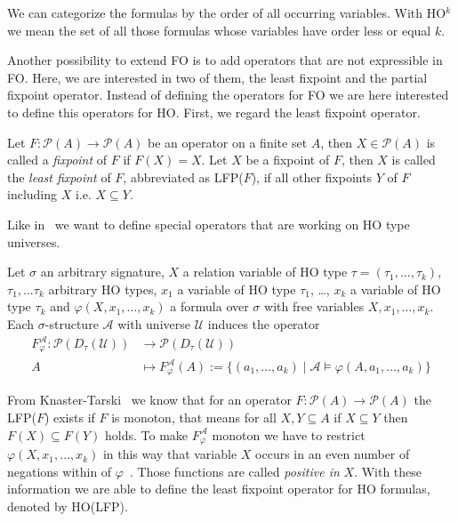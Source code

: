 We can categorize the formulas by the order of all occurring variables. With HO$^k$ we mean the set of all those
formulas whose variables have order less or equal $k$.

Another possibility to extend FO is to add operators that are not expressible in FO. Here, we are interested in two
of them, the least fixpoint and the partial fixpoint operator. Instead of defining the operators for FO we are
here interested to define this operators for HO. First, we regard the least fixpoint operator.

\begin{definition}
   Let $F: \mathscr{P}(A) \rightarrow \mathscr{P}(A)$ be an operator on a finite set $A$, then $X \in \mathscr{P}(A)$
   is called a \emph{fixpoint} of $F$ if $F(X) = X$. Let $X$ be a fixpoint of $F$, then $X$ is called the \emph{least
   fixpoint} of $F$, abbreviated as LFP($F$), if all other fixpoints $Y$ of $F$ including $X$ i.e. $X \subseteq Y$.
\end{definition}

Like in~\cite{freireMartins2011descriptive} we want to define special operators that are working on HO type
universes.

\begin{definition}
    Let $\sigma$ an arbitrary signature, $X$ a relation variable of HO type $\tau = (\tau_1, \dots, \tau_k)$,
    $\tau_1, \dots \tau_k$ arbitrary HO types, $x_1$ a variable of HO type $\tau_1$, \dots, $x_k$ a
    variable of HO type $\tau_k$ and $\varphi(X, x_1, \dots, x_k)$ a formula over $\sigma$ with free variables $X, x_1,
    \dots, x_k$. Each $\sigma$-structure $\mathcal{A}$ with universe $\mathcal{U}$ induces the operator
    \begin{align*}
        F_\varphi^\mathcal{A} : \mathscr{P}(D_\tau(\mathcal{U})) &\longrightarrow \mathscr{P}(D_\tau(\mathcal{U}))\\
        A &\longmapsto F_\varphi^\mathcal{A}(A) := \{(a_1, \dots, a_k) \mid \mathcal{A} \models \varphi(A, a_1, \dots, a_k)\}
    \end{align*}
\end{definition}

From Knaster-Tarski~\cite{tarski1955lattice} we know that for an operator $F: \mathscr{P}(A) \rightarrow \mathscr{P}
(A)$ the LFP($F$) exists if $F$ is monoton, that means for all $X, Y \subseteq A$ if $X \subseteq Y$ then $F(X)
\subseteq F(Y)$ holds. To make $F_\varphi^\mathcal{A}$ monoton we have to restrict $\varphi(X, x_1, \dots, x_k)$ in this way
that variable $X$ occurs in an even number of negations within of $\varphi$~\cite{freireMartins2011descriptive}. Those
functions are called \textit{positive in} $X$. With these information we are able to define the least fixpoint
operator for HO formulas, denoted by HO(LFP).

